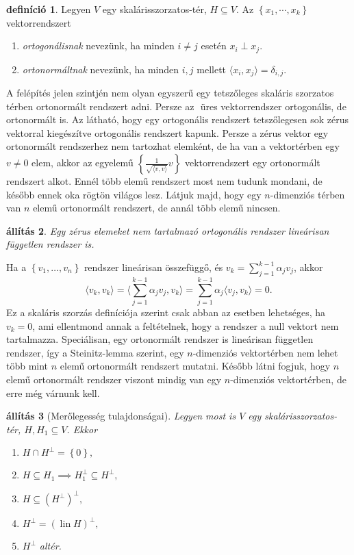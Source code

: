 \documentclass[9pt, a4paper, showtrims]{memoir}
\makeatletter
\renewenvironment{proof}[1][\proofname]
    {\par\pushQED{\qed}%
    \normalfont \topsep6\p@\@plus6\p@\relax
    \trivlist
    \item[\hskip\labelsep
        \itshape
    #1\@addpunct{:}]\ignorespaces}
    {\popQED\endtrivlist\@endpefalse}
\theoremstyle{plain}
\newtheorem{proposition}{állítás}[chapter]
\theoremstyle{remark}
\theoremstyle{definition}
\newtheorem{definition}[proposition]{definíció}
\DeclareMathOperator{\lin}{lin}
\newcommand{\ip}[2]{\langle#1,#2\rangle}
\makeatother
\begin{document}
\begin{definition}
    Legyen $V$ egy skalárisszorzatos-tér, $H\subseteq V$.
    Az $\left\{ x_1,\cdots,x_k \right\}$ vektorrendszert 
    \begin{enumerate}
        \item \emph{ortogonálisnak} nevezünk, ha minden $i\neq j$ esetén 
            $x_i\perp x_j$.
        \item \emph{ortonormáltnak} nevezünk, ha minden $i,j$ mellett $\ip{x_i}{x_j}=\delta_{i,j}$.\qedhere
    \end{enumerate}
\end{definition}
A felépítés jelen szintjén nem olyan egyszerű egy tetszőleges skaláris szorzatos térben ortonormált rendszert
adni. Persze az ${}$ üres vektorrendszer ortogonális, de ortonormált is.
Az látható, hogy egy ortogonális rendszert tetszőlegesen sok zérus vektorral kiegészítve ortogonális rendszert kapunk.
Persze a zérus vektor egy ortonormált rendszerhez nem tartozhat elemként,
de ha van a vektortérben egy $v\neq 0$ elem,
akkor az egyelemű $\left\{ \frac{1}{\sqrt{\ip{v}{v}}}v \right\}$ vektorrendszert egy ortonormált rendszert alkot.
Ennél több elemű rendszert most nem tudunk mondani, de később ennek oka rögtön világos lesz.
Látjuk majd, hogy egy $n$-dimenziós térben van $n$ elemű ortonormált rendszert, de annál több elemű nincsen.
\begin{proposition}
    Egy zérus elemeket nem tartalmazó ortogonális rendszer lineárisan független rendszer is.
\end{proposition}
\begin{proof}
    Ha a $\left\{ v_1,\dots,v_n \right\}$ rendszer lineárisan összefüggő, 
    és $v_k=\sum_{j=1}^{k-1}\alpha_jv_j$,
    akkor 
    \[
        \ip{v_k}{v_k}
        =
        \ip{\sum_{j=1}^{k-1}\alpha_jv_j}{v_k}
        =
        \sum_{j=1}^{k-1}\alpha_j\ip{v_j}{v_k}
        =0.
    \]
    Ez a skaláris szorzás definíciója szerint csak abban az esetben lehetséges, 
    ha $v_k=0$, ami ellentmond annak a feltételnek, hogy a rendszer a null vektort nem tartalmazza.
\end{proof}
Speciálisan, egy ortonormált rendszer is lineárisan független rendszer, így a Steinitz-lemma szerint,
egy $n$-dimenziós vektortérben nem lehet több mint $n$ elemű ortonormált rendszert mutatni.
Később látni fogjuk, hogy $n$ elemű ortonormált rendszer viszont mindig van egy $n$-dimenziós vektortérben,
de erre még várnunk kell.
\begin{proposition}[Merőlegesség tulajdonságai]
    Legyen most is $V$ egy skalárisszorzatos-tér, $H,H_1\subseteq V$.
    Ekkor
    \begin{enumerate}
        \item $H\cap H^{\perp}=\left\{ 0 \right\},$
        \item $H\subseteq H_1\implies H_1^\perp\subseteq H^\perp,$
        \item $H\subseteq \left( H^\perp \right)^\perp,$
        \item $H^{\perp}=\left( \lin H \right)^\perp,$
        \item $H^\perp$ altér.
    \end{enumerate}
\end{proposition}
\end{document}
